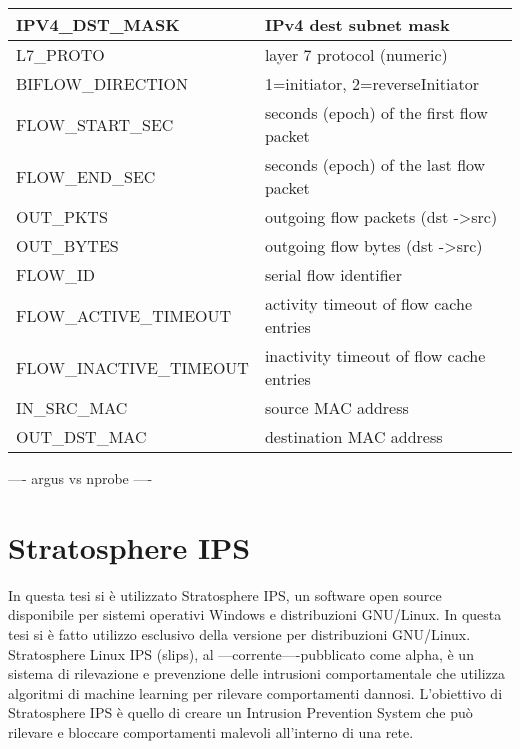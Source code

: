 \documentclass[../main.tex]{subfiles}
\begin{document}
\begin{table}[H]
\begin{tabular}{|l|l|}
IPV4\_DST\_MASK                      & IPv4 dest subnet mask                         \\ \hline
L7\_PROTO                            & layer 7 protocol (numeric)                    \\ \hline
BIFLOW\_DIRECTION                    & 1=initiator, 2=reverseInitiator               \\ \hline
FLOW\_START\_SEC                     & seconds (epoch) of the first flow packet      \\ \hline
FLOW\_END\_SEC                       & seconds (epoch) of the last flow packet       \\ \hline
OUT\_PKTS                            & outgoing flow packets (dst -\textgreater src) \\ \hline
OUT\_BYTES                           & outgoing flow bytes (dst -\textgreater src)   \\ \hline
FLOW\_ID                             & serial flow identifier                        \\ \hline
FLOW\_ACTIVE\_TIMEOUT                & activity timeout of flow cache entries        \\ \hline
FLOW\_INACTIVE\_TIMEOUT              & inactivity timeout of flow cache entries      \\ \hline
IN\_SRC\_MAC                         & source MAC address                            \\ \hline
OUT\_DST\_MAC                        & destination MAC address                       \\ \hline
\end{tabular}
\end{table}

---- argus vs nprobe ----

\section{Stratosphere IPS}
In questa tesi si è utilizzato Stratosphere IPS, un software open source disponibile per sistemi operativi Windows e distribuzioni GNU/Linux. In questa tesi si è fatto utilizzo esclusivo della versione per distribuzioni GNU/Linux.
Stratosphere Linux IPS (slips), al ---corrente----pubblicato come alpha, è un sistema di rilevazione e prevenzione delle intrusioni comportamentale che utilizza algoritmi di machine learning per rilevare comportamenti dannosi. 
L'obiettivo di Stratosphere IPS è quello di creare un Intrusion Prevention System che può rilevare e bloccare comportamenti malevoli all'interno di una rete.
\end{document}
